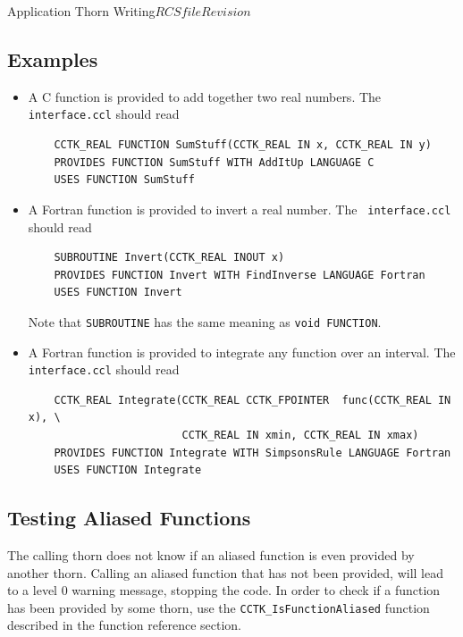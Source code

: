 \begin{cactuspart}{Application Thorn Writing}{$RCSfile$}{$Revision$}
\subsection{Examples}

\begin{itemize}
\item A C function is provided to add together two real numbers. The {\tt
    interface.ccl} should read
\begin{verbatim}
    CCTK_REAL FUNCTION SumStuff(CCTK_REAL IN x, CCTK_REAL IN y)
    PROVIDES FUNCTION SumStuff WITH AddItUp LANGUAGE C
    USES FUNCTION SumStuff
\end{verbatim}

\item A Fortran function is provided to invert a real number. The {\tt
    interface.ccl} should read
\begin{verbatim}
    SUBROUTINE Invert(CCTK_REAL INOUT x)
    PROVIDES FUNCTION Invert WITH FindInverse LANGUAGE Fortran
    USES FUNCTION Invert
\end{verbatim}
\noindent Note that \texttt{SUBROUTINE} has the same meaning as \texttt{void
  FUNCTION}.

\item A Fortran function is provided to integrate any function over
  an interval. The \texttt{interface.ccl} should read
\begin{verbatim}
    CCTK_REAL Integrate(CCTK_REAL CCTK_FPOINTER  func(CCTK_REAL IN x), \
                        CCTK_REAL IN xmin, CCTK_REAL IN xmax)
    PROVIDES FUNCTION Integrate WITH SimpsonsRule LANGUAGE Fortran
    USES FUNCTION Integrate
\end{verbatim}

\end{itemize}

\subsection{Testing Aliased Functions}

The calling thorn does not know if an aliased function is even
provided by another thorn. Calling an aliased function that has not
been provided, will lead to a level 0 warning message, stopping the
code. In order to check if a function has been provided by some thorn,
use the \texttt{CCTK\_IsFunctionAliased} function described in the
function reference section.



\end{cactuspart}
